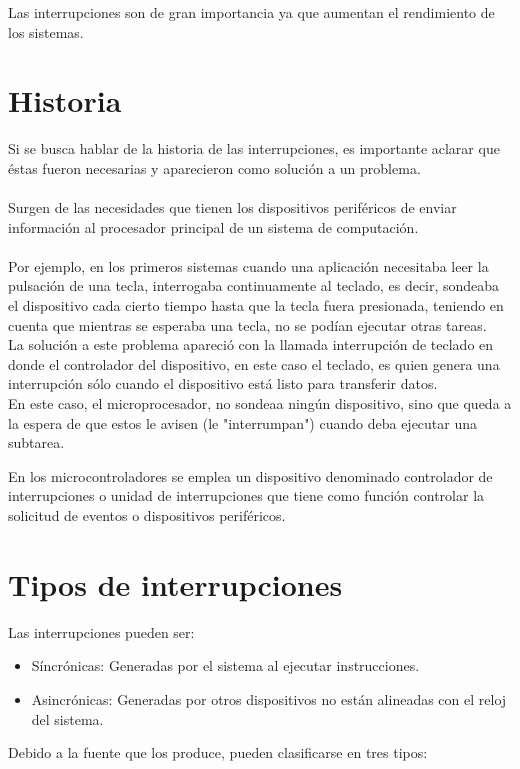 \documentclass{report}   %
\begin{document}
Las interrupciones son de gran importancia ya que aumentan el rendimiento de los sistemas. 

\section*{Historia}
Si se busca hablar de la historia de las interrupciones, es importante aclarar que éstas fueron necesarias y aparecieron como solución a un problema.\\\\
Surgen de las necesidades que tienen los dispositivos periféricos de enviar información al procesador principal de un sistema de computación.\\\\ Por ejemplo, en los primeros sistemas cuando una aplicación necesitaba leer la pulsación de una tecla, interrogaba continuamente al teclado, es decir, sondeaba el dispositivo cada cierto tiempo hasta que la tecla fuera presionada, teniendo en cuenta que mientras se esperaba una tecla, no se podían ejecutar otras tareas.\\ La solución a este problema apareció con la llamada interrupción de teclado en donde el controlador del dispositivo, en este caso el teclado, es quien genera una interrupción sólo cuando el dispositivo está listo para transferir datos.\\ En este caso, el microprocesador, no sondeaa ningún dispositivo, sino que queda a la espera de que estos le avisen (le "interrumpan") cuando deba ejecutar una subtarea.

En los microcontroladores se emplea un dispositivo denominado controlador de interrupciones o unidad de interrupciones que tiene como función controlar la solicitud de eventos o dispositivos periféricos.

\section*{Tipos de interrupciones}
Las interrupciones pueden ser:
\begin{itemize}
\item Síncrónicas:  Generadas por el sistema al ejecutar instrucciones.
\item Asincrónicas: Generadas por otros dispositivos no están alineadas con el reloj del sistema.
\end{itemize}

Debido a la fuente que los produce, pueden clasificarse en tres tipos:
\end{document}
